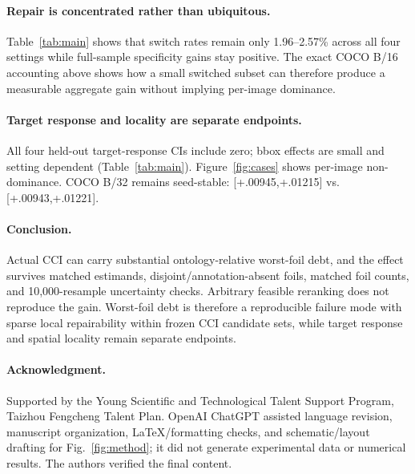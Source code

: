 \documentclass[10pt]{article}
\begin{document}
\paragraph{Repair is concentrated rather than ubiquitous.}
Table~\ref{tab:main} shows that switch rates remain only 1.96--2.57\% across all
four settings while full-sample specificity gains stay positive. The exact COCO
B/16 accounting above shows how a small switched subset can therefore produce a
measurable aggregate gain without implying per-image dominance.

\paragraph{Target response and locality are separate endpoints.}
All four held-out target-response CIs include zero; bbox effects are small and
setting dependent (Table~\ref{tab:main}). Figure~\ref{fig:cases} shows per-image
non-dominance. COCO B/32 remains seed-stable: [+.00945,+.01215] vs. [+.00943,+.01221].
\paragraph{Conclusion.}
Actual CCI can carry substantial ontology-relative worst-foil debt, and the
effect survives matched estimands, disjoint/annotation-absent foils, matched foil
counts, and 10,000-resample uncertainty checks. Arbitrary feasible reranking does
not reproduce the gain. Worst-foil debt is therefore a reproducible failure mode
with sparse local repairability within frozen CCI candidate sets, while target
response and spatial locality remain separate endpoints.

\paragraph{Acknowledgment.}
Supported by the Young Scientific and Technological Talent Support Program,
Taizhou Fengcheng Talent Plan. OpenAI ChatGPT assisted language revision,
manuscript organization, LaTeX/formatting checks, and schematic/layout drafting
for Fig.~\ref{fig:method}; it did not generate experimental data or numerical
results. The authors verified the final content.

\clearpage
\balance


\end{document}
